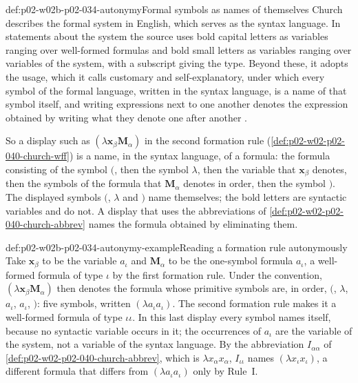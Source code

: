 \begin{hbconvention}{def:p02-w02b-p02-034-autonymy}{Formal symbols as names of themselves}
Church describes the formal system in English, which serves as the syntax
language.  In statements about the system the source uses bold capital
letters as variables ranging over well-formed formulas and bold small
letters as variables ranging over variables of the system, with a subscript
giving the type.  Beyond these, it adopts the usage, which it calls
customary and self-explanatory, under which every symbol of the formal
language, written in the syntax language, is a name of that symbol itself,
and writing expressions next to one another denotes the expression obtained
by writing what they denote one after another
\cite[\S2, pp.~57--58]{Church1940}.

So a display such as \((\lambda\mathbf x_\beta\mathbf M_\alpha)\) in the
second formation rule (\cref{def:p02-w02-p02-040-church-wff}) is a name, in
the syntax language, of a formula: the formula consisting of the symbol
\((\), then the symbol \(\lambda\), then the variable that
\(\mathbf x_\beta\) denotes, then the symbols of the formula that
\(\mathbf M_\alpha\) denotes in order, then the symbol \()\).  The
displayed symbols \((\), \(\lambda\) and \()\) name themselves; the bold
letters are syntactic variables and do not.  A display that uses the
abbreviations of \cref{def:p02-w02-p02-040-church-abbrev} names the formula
obtained by eliminating them.
\end{hbconvention}

\begin{hbexample}{def:p02-w02b-p02-034-autonymy-example}{Reading a formation rule autonymously}
Take \(\mathbf x_\beta\) to be the variable \(a_\iota\) and
\(\mathbf M_\alpha\) to be the one-symbol formula \(a_\iota\), a
well-formed formula of type \(\iota\) by the first formation rule.  Under the
convention, \((\lambda\mathbf x_\beta\mathbf M_\alpha)\) then denotes the
formula whose primitive symbols are, in order, \((\), \(\lambda\),
\(a_\iota\), \(a_\iota\), \()\): five symbols, written
\((\lambda a_\iota a_\iota)\).  The second formation rule makes it a
well-formed formula of type \(\iota\iota\).  In this last display every
symbol names itself, because no syntactic variable occurs in it; the
occurrences of \(a_\iota\) are the variable of the system, not a variable of
the syntax language.  By the abbreviation \(I_{\alpha\alpha}\) of
\cref{def:p02-w02-p02-040-church-abbrev}, which is \(\lambda x_\alpha x_\alpha\),
\(I_{\iota\iota}\) names \((\lambda x_\iota x_\iota)\), a different formula
that differs from \((\lambda a_\iota a_\iota)\) only by Rule~I.
\end{hbexample}

